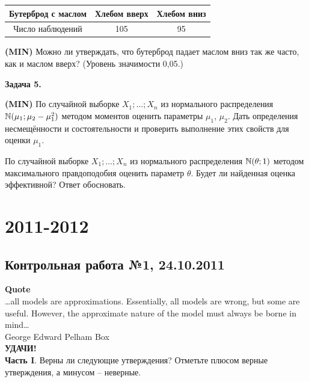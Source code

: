 \documentclass[12pt, a4paper]{article}\usepackage[]{graphicx}\usepackage[]{color}
\newenvironment{enumerate*}{
\begin{enumerate}
  \setlength{\itemsep}{0pt}
  \setlength{\parskip}{0pt}
  \setlength{\parsep}{0pt}
}{\end{enumerate}}
\newcommand{\MIN}{\textbf{(MIN)}{}}
\newenvironment{centered}{%
  \begin{list}{}{%
    \topsep0pt
  }
  \centering
  \item[]
}
{\end{list}}
\begin{document}
\begin{centered}
\begin{tabular}{|c|c|c|}
\hline
Бутерброд с маслом & Хлебом вверх & Хлебом вниз \\ \hline
Число наблюдений & 105 & 95 \\ \hline
\end{tabular}\end{centered}\par\smallskip
\MIN{} Можно ли утверждать, что бутерброд падает маслом вниз так же часто, как и маслом вверх? (Уровень значимости 0{,}05.)
\par\medskip
\textbf{Задача 5.}
\begin{enumerate*}
\item \MIN{} По случайной выборке $X_1;\ldots;X_n$ из нормального распределения $\mathbb N(\mu_1;\mu_2-\mu_1^2)$ методом моментов оценить параметры $\mu_1$, $\mu_2$. Дать определения несмещённости и состоятельности и проверить выполнение этих свойств для оценки $\mu_1$.
\item По случайной выборке $X_1;\ldots;X_n$ из нормального распределения $\mathbb N(\theta;1)$ методом максимального правдоподобия оценить параметр $\theta$. Будет ли найденная оценка эффективной? Ответ обосновать.
\end{enumerate*}





\section{2011-2012}

\subsection{Контрольная работа №1, 24.10.2011}

\textbf{Quote}\\
\ldots all models are approximations. Essentially, all models are wrong, but some are useful. However, the approximate nature of the model must always be borne in mind\ldots\\
George Edward Pelham Box\\

\textbf{УДАЧИ!} \\

\textbf{Часть I}. Верны ли следующие утверждения? Отметьте плюсом верные утверждения, а минусом -- неверные. \\

\renewcommand\arraystretch{2.0}
\end{document}
